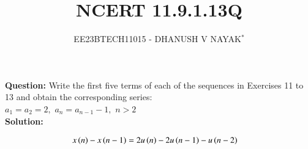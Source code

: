 \documentclass[journal,12pt,twocolumn]{IEEEtran}
\theoremstyle{remark}
\begin{document}

\title{NCERT 11.9.1.13Q}
\author{EE23BTECH11015 - DHANUSH V NAYAK$^{*}$%
}
\maketitle
\newpage
\bigskip
\renewcommand{\thefigure}{\arabic{figure}}
\renewcommand{\thetable}{\theenumi}
\textbf{Question:} Write the first five terms of each of the sequences in Exercises 11 to 13 and obtain the corresponding series:\\
$a_1=a_2=2,$\hspace{5pt} $a_n=a_{n-1} -1,$\hspace{5pt} $n>2$\\
\textbf{Solution:}

\begin{align}
    x\left(n\right) - x\left(n-1\right) &= 2u\left(n\right)-2u\left(n-1\right)-u\left(n-2\right)\label{eq:11.9.1.13.1}
\end{align}
\end{document}
